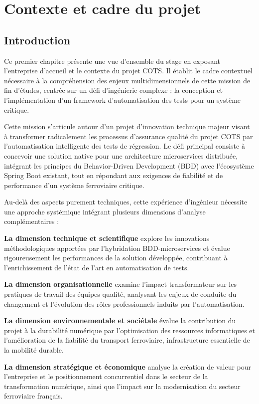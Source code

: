 \chapter{Contexte et cadre du projet}

\section{Introduction}

Ce premier chapitre présente une vue d'ensemble du stage en exposant l'entreprise d'accueil et le contexte du projet COTS. Il établit le cadre contextuel nécessaire à la compréhension des enjeux multidimensionnels de cette mission de fin d'études, centrée sur un défi d'ingénierie complexe : la conception et l'implémentation d'un framework d'automatisation des tests pour un système critique.

Cette mission s'articule autour d'un projet d'innovation technique majeur visant à transformer radicalement les processus d'assurance qualité du projet COTS par l'automatisation intelligente des tests de régression. Le défi principal consiste à concevoir une solution native pour une architecture microservices distribuée, intégrant les principes du Behavior-Driven Development (BDD) avec l'écosystème Spring Boot existant, tout en répondant aux exigences de fiabilité et de performance d'un système ferroviaire critique.

Au-delà des aspects purement techniques, cette expérience d'ingénieur nécessite une approche systémique intégrant plusieurs dimensions d'analyse complémentaires :

\textbf{La dimension technique et scientifique} explore les innovations méthodologiques apportées par l'hybridation BDD-microservices et évalue rigoureusement les performances de la solution développée, contribuant à l'enrichissement de l'état de l'art en automatisation de tests.

\textbf{La dimension organisationnelle} examine l'impact transformateur sur les pratiques de travail des équipes qualité, analysant les enjeux de conduite du changement et l'évolution des rôles professionnels induits par l'automatisation.

\textbf{La dimension environnementale et sociétale} évalue la contribution du projet à la durabilité numérique par l'optimisation des ressources informatiques et l'amélioration de la fiabilité du transport ferroviaire, infrastructure essentielle de la mobilité durable.

\textbf{La dimension stratégique et économique} analyse la création de valeur pour l'entreprise et le positionnement concurrentiel dans le secteur de la transformation numérique, ainsi que l'impact sur la modernisation du secteur ferroviaire français.

